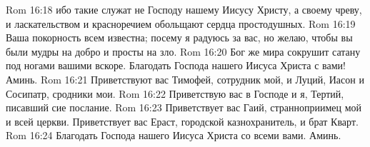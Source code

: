 \vs Rom 16:18 ибо такие  служат не Господу нашему Иисусу Христу, а своему чреву, и ласкательством и красноречием обольщают сердца простодушных.
\vs Rom 16:19 Ваша покорность  всем известна; посему я радуюсь за вас, но желаю, чтобы вы были мудры на добро и просты на зло.
\vs Rom 16:20 Бог же мира сокрушит сатану под ногами вашими вскоре. Благодать Господа нашего Иисуса Христа с вами! Аминь.
\rsbpar\vs Rom 16:21 Приветствуют вас Тимофей, сотрудник мой, и Луций, Иасон и Сосипатр, сродники мои.
\vs Rom 16:22 Приветствую вас в Господе и я, Тертий, писавший сие послание.
\vs Rom 16:23 Приветствует вас Гаий, странноприимец мой и всей церкви. Приветствует вас Ераст, городской казнохранитель, и брат Кварт.
\rsbpar\vs Rom 16:24 Благодать Господа нашего Иисуса Христа со всеми вами. Аминь.
